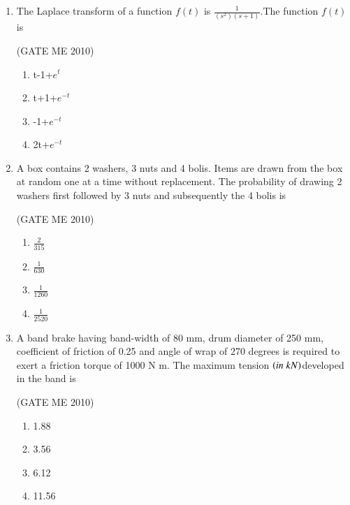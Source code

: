 \documentclass[journal,12pt,onecolumn]{IEEEtran}
\theoremstyle{remark}
\begin{document}
\begin{enumerate}
\item The Laplace transform of a function $f(t)$ is $\frac{1}{(s^{2})(s+1)}$.The function $f(t)$ is

  \hfill{(GATE ME 2010)}\\
  
\begin{multicols}{4}
\begin{enumerate}

\item t-1+$e^{t}$
\item t+1+$e^{-t}$
\item -1+$e^{-t}$
\item 2t+$e^{-t}$
\end{enumerate}
\end{multicols}


\item A box contains 2 washers, 3 nuts and 4 bolis. Items are drawn from the box at random one at a time without replacement. The probability of drawing 2 washers first followed by 3 nuts and subsequently the 4 bolis is

  \hfill{(GATE ME 2010)}\\
  
\begin{multicols}{4}
\begin{enumerate}
\item $\frac{2}{315}$
\item $\frac{1}{630}$
\item $\frac{1}{1260}$
\item $\frac{1}{2520}$

\end{enumerate}
\end{multicols}


\item A band brake having band-width of 80 mm, drum diameter of 250 mm, coefficient of friction of 0.25 and angle of wrap of 270 degrees is required to exert a friction torque of 1000 N m. The maximum tension $\left(in\;kN\right)$developed in the band is

  \hfill{(GATE ME 2010)}\\
  
\begin{multicols}{4}
\begin{enumerate}
\item 1.88
\item 3.56
\item 6.12
\item 11.56
\end{enumerate}
\end{multicols}



\end{enumerate}
\end{document}
